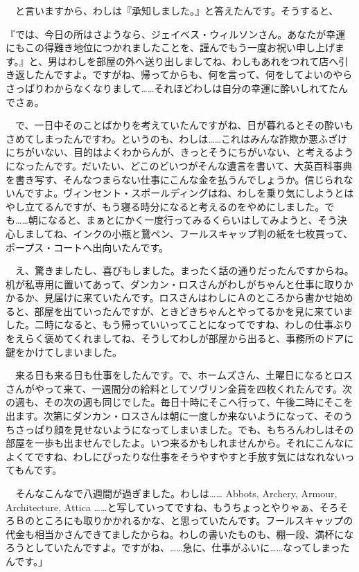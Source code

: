 \documentclass[tate,paper=b6j,jafontsize=9pt]{jlreq}
\begin{document}
　と言いますから、わしは『承知しました。』と答えたんです。そうすると、

『では、今日の所はさようなら、ジェイベス・ウィルソンさん。あなたが幸運にもこの得難き地位につかれましたことを、謹んでもう一度お祝い申し上げます。』と、男はわしを部屋の外へ送り出しましてね、わしもあれをつれて店へ引き返したんですよ。ですがね、帰ってからも、何を言って、何をしてよいのやらさっぱりわからなくなりまして……それほどわしは自分の幸運に酔いしれてたんでさぁ。

　で、一日中そのことばかりを考えていたんですがね、日が暮れるとその酔いもさめてしまったんですわ。というのも、わしは……これはみんな詐欺か悪ふざけにちがいない、目的はよくわからんが、きっとそうにちがいない、と考えるようになったんです。だいたい、どこのどいつがそんな遺言を書いて、大英百科事典を書き写す、そんなつまらない仕事にこんな金を払うんでしょうか。信じられないんですよ。ヴィンセント・スポールディングはね、わしを乗り気にしようとはやし立てるんですが、もう寝る時分になると考えるのをやめにしました。でも……朝になると、まぁとにかく一度行ってみるくらいはしてみようと、そう決心しましてね、インクの小瓶と鵞ペン、フールスキャップ判の紙を七枚買って、ポープス・コートへ出向いたんです。

　え、驚きましたし、喜びもしました。まったく話の通りだったんですからね。机が私専用に置いてあって、ダンカン・ロスさんがわしがちゃんと仕事に取りかかるか、見届けに来ていたんです。ロスさんはわしにＡのところから書かせ始めると、部屋を出ていったんですが、ときどきちゃんとやってるかを見に来ていました。二時になると、もう帰っていいってことになってですね、わしの仕事ぶりをえらく褒めてくれましてね、そうしてわしが部屋から出ると、事務所のドアに鍵をかけてしまいました。

　来る日も来る日も仕事をしたんです。で、ホームズさん、土曜日になるとロスさんがやって来て、一週間分の給料としてソヴリン金貨を四枚くれたんです。次の週も、その次の週も同じでした。毎日十時にそこへ行って、午後二時にそこを出ます。次第にダンカン・ロスさんは朝に一度しか来ないようになって、そのうちさっぱり顔を見せないようになってしまいました。でも、もちろんわしはその部屋を一歩も出ませんでしたよ。いつ来るかもしれませんから。それにこんなによくてですね、わしにぴったりな仕事をそうやすやすと手放す気にはなれないってもんです。

　そんなこんなで八週間が過ぎました。わしは…… Abbots, Archery, Armour, Architecture, Attica ……と写していってですね、もうちょっとやりゃぁ、そろそろＢのところにも取りかかれるかな、と思っていたんです。フールスキャップの代金も相当かさんできてましたからね。わしの書いたものも、棚一段、満杯になろうとしていたんですよ。ですがね、……急に、仕事がふいに……なってしまったんです。」
\end{document}
